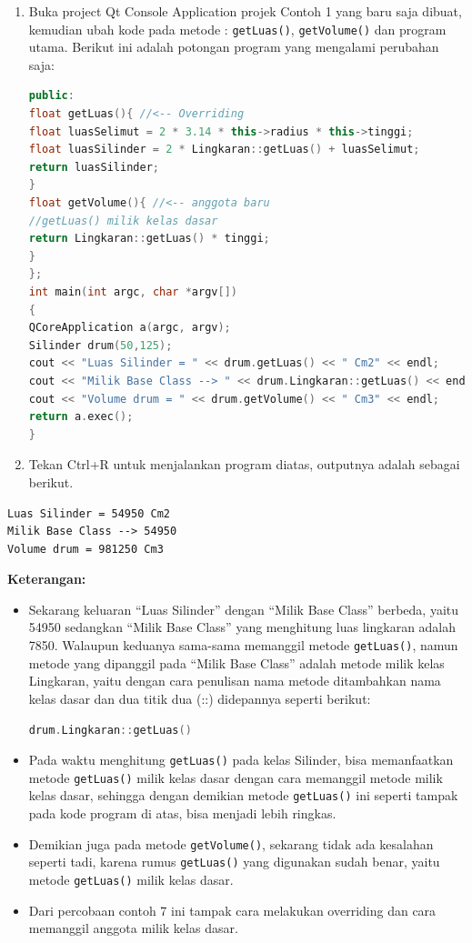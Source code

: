 \begin{enumerate}
\def\labelenumi{\arabic{enumi}.}
\item
  Buka project Qt Console Application projek Contoh 1 yang baru saja
  dibuat, kemudian ubah kode pada metode : \texttt{getLuas()},
  \texttt{getVolume()} dan program utama. Berikut ini adalah potongan
  program yang mengalami perubahan saja:

\begin{lstlisting}[language=c++]
public:
float getLuas(){ //<-- Overriding
float luasSelimut = 2 * 3.14 * this->radius * this->tinggi;
float luasSilinder = 2 * Lingkaran::getLuas() + luasSelimut;
return luasSilinder;
}
float getVolume(){ //<-- anggota baru
//getLuas() milik kelas dasar
return Lingkaran::getLuas() * tinggi;
}
};
int main(int argc, char *argv[])
{
QCoreApplication a(argc, argv);
Silinder drum(50,125);
cout << "Luas Silinder = " << drum.getLuas() << " Cm2" << endl;
cout << "Milik Base Class --> " << drum.Lingkaran::getLuas() << endl;
cout << "Volume drum = " << drum.getVolume() << " Cm3" << endl;
return a.exec();
}
\end{lstlisting}
\item
  Tekan Ctrl+R untuk menjalankan program diatas, outputnya adalah
  sebagai berikut.
\end{enumerate}

\begin{verbatim}
Luas Silinder = 54950 Cm2
Milik Base Class --> 54950
Volume drum = 981250 Cm3
\end{verbatim}

\textbf{Keterangan:}

\begin{itemize}
\item
  Sekarang keluaran ``Luas Silinder'' dengan ``Milik Base Class''
  berbeda, yaitu 54950 sedangkan ``Milik Base Class'' yang menghitung
  luas lingkaran adalah 7850. Walaupun keduanya sama-sama memanggil
  metode \texttt{getLuas()}, namun metode yang dipanggil pada ``Milik
  Base Class'' adalah metode milik kelas Lingkaran, yaitu dengan cara
  penulisan nama metode ditambahkan nama kelas dasar dan dua titik dua
  (::) didepannya seperti berikut:

\begin{lstlisting}[language=c++]
drum.Lingkaran::getLuas()
\end{lstlisting}
\item
  Pada waktu menghitung \texttt{getLuas()} pada kelas Silinder, bisa
  memanfaatkan metode \texttt{getLuas()} milik kelas dasar dengan cara
  memanggil metode milik kelas dasar, sehingga dengan demikian metode
  \texttt{getLuas()} ini seperti tampak pada kode program di atas, bisa
  menjadi lebih ringkas.
\item
  Demikian juga pada metode \texttt{getVolume()}, sekarang tidak ada
  kesalahan seperti tadi, karena rumus \texttt{getLuas()} yang digunakan
  sudah benar, yaitu metode \texttt{getLuas()} milik kelas dasar.
\item
  Dari percobaan contoh 7 ini tampak cara melakukan overriding dan cara
  memanggil anggota milik kelas dasar.
\end{itemize}

